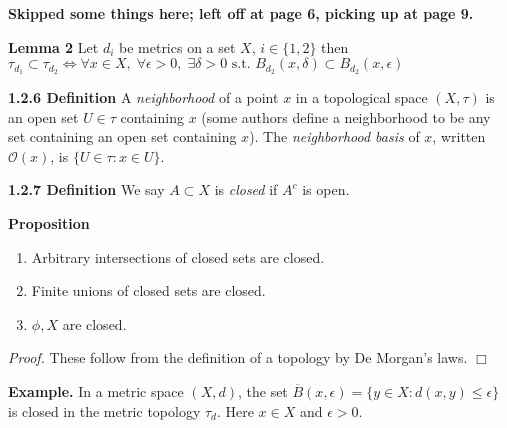 \documentclass[12pt]{article}
\newcommand{\st}[0]{ \textrm{ s.t. } }
\newcommand{\lrimply}[0] { \Leftrightarrow }
\newcommand{\eps}[0] {  \epsilon }
\newcommand{\curlyO}[0] { \mathcal{O} }
\begin{document}
 { \bf Skipped some things here; left off at page 6, picking up at page 9.}\begin{flushleft} 


\begin{flushleft} {\bf Lemma 2 } 
Let $d_i$ be metrics on a set $X$, $i \in \{ 1,2\}$ then $\tau_{d_1} \subset \tau _{d_2} \lrimply \forall x \in X, \; \forall \eps > 0, \; \exists \delta > 0 \st B_{d_2}(x, \delta) \subset B_{d_2}(x, \eps)  $

\end{flushleft}





















 { \bf 1.2.6 Definition }A \emph{neighborhood} of a point $x$ in a topological space $(X, \tau)$ is an open set $U \in \tau$ containing $x$ (some authors define a neighborhood to be 
 any set containing an open set containing  $x$). The \emph{neighborhood basis} of $x$, written $\curlyO(x)$,  is $\{ U \in \tau :  x \in U\}$.

\end{flushleft}


\begin{flushleft} 
 { \bf 1.2.7 Definition }We say $A \subset X$ is \emph{closed} if $A^c$ is open.\end{flushleft}\begin{flushleft} 
 { \bf Proposition }\begin{enumerate}
\item
                Arbitrary intersections of closed sets are closed.
            \item
                Finite unions of closed sets are closed.
            \item
                $\phi, X$ are closed.
            \end{enumerate}\begin{flushleft} 
 \emph{Proof.  } These follow from the definition of a 
topology by De Morgan's laws. $\Box$
  \end{flushleft}\end{flushleft}\begin{flushleft} 
 { \bf Example.} In a metric space $(X, d)$, the set
$\overline{B}(x, \eps) = \{ y \in X :  d(x,y) \le \eps \}$ is 
closed in the metric topology $\tau_d$. Here $x \in X$ and $\eps > 0$.
\end{flushleft} 
\end{document}
